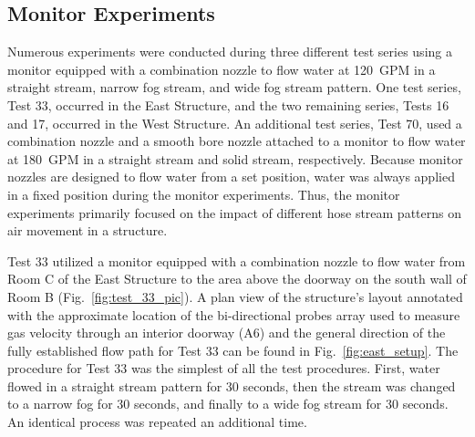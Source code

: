 \documentclass[12pt,oneside]{book}
\begin{document}
\subsection{Monitor Experiments}
\label{sec:monitor_procedure}
Numerous experiments were conducted during three different test series using a monitor equipped with a combination nozzle to flow water at 120~GPM in a straight stream, narrow fog stream, and wide fog stream pattern. One test series, Test 33, occurred in the East Structure, and the two remaining series, Tests 16 and 17, occurred in the West Structure. An additional test series, Test 70, used a combination nozzle and a smooth bore nozzle attached to a monitor to flow water at 180~GPM in a straight stream and solid stream, respectively. Because monitor nozzles are designed to flow water from a set position, water was always applied in a fixed position during the monitor experiments. Thus, the monitor experiments primarily focused on the impact of different hose stream patterns on air movement in a structure.

Test 33 utilized a monitor equipped with a combination nozzle to flow water from Room C of the East Structure to the area above the doorway on the south wall of Room B (Fig.~\ref{fig:test_33_pic}). A plan view of the structure's layout annotated with the approximate location of the bi-directional probes array used to measure gas velocity through an interior doorway (A6) and the general direction of the fully established flow path for Test 33 can be found in Fig.~\ref{fig:east_setup}. The procedure for Test 33 was the simplest of all the test procedures. First, water flowed in a straight stream pattern for 30 seconds, then the stream was changed to a narrow fog for 30 seconds, and finally to a wide fog stream for 30 seconds. An identical process was repeated an additional time.
\end{document}
